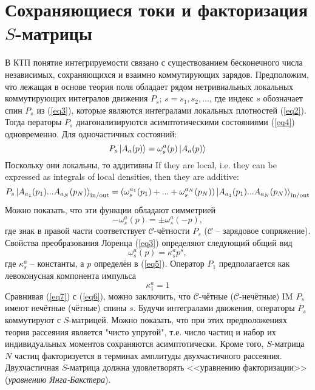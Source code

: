 \documentclass[12pt]{article}
\theoremstyle{definition}
\begin{document}
\section{Сохраняющиеся токи и факторизация $S$-матрицы}
В КТП понятие интегрируемости связано с существованием бесконечного числа независимых, сохраняющихся и взаимно коммутирующих зарядов. Предположим, что лежащая в основе теория поля обладает рядом нетривиальных локальных коммутирующих интегралов движения $P_s$; $s = s_1,s_2,...$, где индекс $s$ обозначает спин $P_s$ из (\ref{eq3}), которые являются интегралами локальных плотностей (\ref{eq2}). Тогда ператоры $P_s$ диагонализируются асимптотическими состояниями (\ref{eq4}) одновременно. Для одночастичных состояний:
\begin{equation}
    P_s\ket{A_a(p)}=\omega^a_s(p)\ket{A_a(p)}
\end{equation}
Поскольку они локальны, то аддитивны
If they are local, i.e. they can be expressed as integrals of local densities, then they are
additive:
\begin{equation}\label{eq19}
    P_s\ket{A_{a_1}(p_1)...A_{a_N}(p_N)}_{\text{in}/\text{out}}=(\omega_s^{a_1}(p_1)+...+\omega_s^{a_N}(p_N))\ket{A_{a_1}(p_1)...A_{a_N}(p_N)}_{\text{in}/\text{out}}
\end{equation}
Можно показать, что эти функции обладают симметрией
\begin{equation}\label{eq6}
    -\omega_s^a(p)=\pm\omega_s^a(-p),
\end{equation}
где знак в правой части соответствует $\mathcal{C}$-чётности $P_s$ ($\mathcal{C}$ -- зарядовое сопряжение). Свойства преобразования Лоренца (\ref{eq3}) определяют следующий общий вид
\begin{equation}\label{eq7}
    \omega_s^a(p)=\kappa_s^ap^s,
\end{equation}
где $\kappa_s^a$ -- константы, а $p$ определён в (\ref{eq5}). Оператор $P_1$ предполагается как левоконусная компонента импульса
\begin{equation}
    \kappa_1^a=1
\end{equation}
Сравнивая (\ref{eq7}) с (\ref{eq6}), можно заключить, что $\mathcal{C}$-чётные ($\mathcal{C}$-нечётные) IM $P_s$ имеют нечётные (чётные) спины $s$. Будучи интегралами движения, операторы $P_s$ коммутируют с $S$-матрицей. Можно показать, что при этих предположениях теория рассеяния является "чисто упругой", т.е. число частиц и набор их индивидуальных моментов сохраняются асимптотически. Кроме того, $S$-матрица $N$ частиц факторизуется в терминах амплитуды двухчастичного рассеяния. Двухчастичная $S$-матрица должна удовлетворять <<уравнению факторизации>> (\textit{уравнению Янга-Бакстера}).\\
\end{document}
